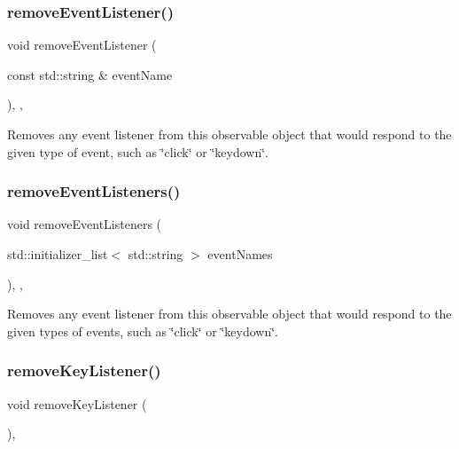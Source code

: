 \subsubsection{\texorpdfstring{remove\+Event\+Listener()}{removeEventListener()}}
{\footnotesize\ttfamily void remove\+Event\+Listener (\begin{DoxyParamCaption}\item[{const std\+::string \&}]{event\+Name }\end{DoxyParamCaption})\hspace{0.3cm}{\ttfamily [protected]}, {\ttfamily [virtual]}, {\ttfamily [inherited]}}



Removes any event listener from this observable object that would respond to the given type of event, such as \char`\"{}click\char`\"{} or \char`\"{}keydown\char`\"{}. 

\mbox{\label{classGObservable_af51cc35c29a1bd1908609d432decdbb6}} 
\subsubsection{\texorpdfstring{remove\+Event\+Listeners()}{removeEventListeners()}}
{\footnotesize\ttfamily void remove\+Event\+Listeners (\begin{DoxyParamCaption}\item[{std\+::initializer\+\_\+list$<$ std\+::string $>$}]{event\+Names }\end{DoxyParamCaption})\hspace{0.3cm}{\ttfamily [protected]}, {\ttfamily [virtual]}, {\ttfamily [inherited]}}



Removes any event listener from this observable object that would respond to the given types of events, such as \char`\"{}click\char`\"{} or \char`\"{}keydown\char`\"{}. 

\mbox{\label{classGInteractor_a43095f41cab3be732b49f29970484b05}} 
\subsubsection{\texorpdfstring{remove\+Key\+Listener()}{removeKeyListener()}}
{\footnotesize\ttfamily void remove\+Key\+Listener (\begin{DoxyParamCaption}{ }\end{DoxyParamCaption})\hspace{0.3cm}{\ttfamily [virtual]}, {\ttfamily [inherited]}}



